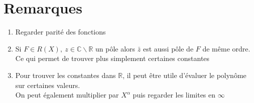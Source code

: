 \documentclass[fleqn]{article}
\theoremstyle{definition} \newtheorem*{defi}{D\'efinition}
\theoremstyle{definition} \newtheorem*{theo}{Th\'eor\`eme}
\theoremstyle{definition} \newtheorem*{coro}{Corollaire}
\theoremstyle{definition} \newtheorem*{nota}{Notation}
\theoremstyle{remark} \newtheorem*{rqs}{Remarques}
\theoremstyle{definition} \newtheorem*{prop}{Propri\'et\'e}
\begin{document}
\section{Remarques}
\begin{enumerate}
	\item Regarder parit\'e des fonctions
	\item Si $F \in R(X),\ z \in \mathbb{C} \backslash \mathbb{R}$ un p\^ole alors $\bar{z}$ est aussi p\^ole de $F$ de m\^eme ordre. Ce qui
		permet de trouver plus simplement certaines constantes
	\item Pour trouver les constantes dans $\mathbb{R}$, il peut \^etre utile d'\'evaluer le polyn\^ome sur certaines valeurs.\\ On peut
		\'egalement multiplier par $X^\alpha$ puis regarder les limites en $\infty$
\end{enumerate}
\end{document}
